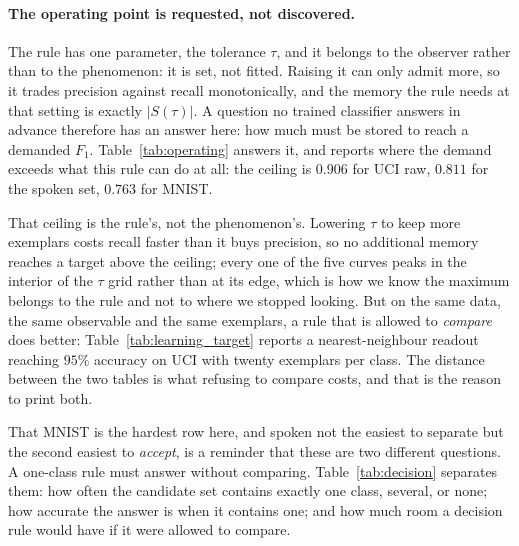 \documentclass[10pt]{article}
\theoremstyle{plain}
\theoremstyle{definition}
\theoremstyle{remark}
\newcommand{\fitwidth}[1]{%
  \resizebox{\ifdim\width>\linewidth\linewidth\else\width\fi}{!}{#1}}
\begin{document}
\begin{table}[!htbp]\centering\small
\fitwidth{}
\caption{\small Exemplars drawn without selection against exemplars chosen by
the greedy net, at equal budget $k$. Same split, same seeds, same 1-NN decision
over the ten exemplar sets; accuracy on held-out realisations, mean of ten
draws. \emph{Any $k$} is not a selection method: the column exists to show that
none is needed. The net's first point is the best single exemplar in every set;
its later points buy coverage rather than mass.}
\label{tab:selector}
\end{table}

\paragraph{The operating point is requested, not discovered.}
The rule has one parameter, the tolerance $\tau$, and it belongs to the
observer rather than to the phenomenon: it is set, not fitted. Raising it can
only admit more, so it trades precision against recall monotonically, and the
memory the rule needs at that setting is exactly $|S(\tau)|$. A question no
trained classifier answers in advance therefore has an answer here: how much
must be stored to reach a demanded $F_1$. Table~\ref{tab:operating} answers it,
and reports where the demand exceeds what this rule can do at all: the ceiling
is $0.906$ for UCI raw, $0.811$ for the spoken set, $0.763$ for MNIST.

That ceiling is the rule's, not the phenomenon's. Lowering $\tau$ to keep more exemplars costs
recall faster than it buys precision, so no additional memory reaches a target
above the ceiling; every one of the five curves peaks in the interior of the
$\tau$ grid rather than at its edge, which is how we know the maximum belongs
to the rule and not to where we stopped looking. But on the same data, the same
observable and the same exemplars, a rule that is allowed to \emph{compare}
does better: Table~\ref{tab:learning_target} reports a nearest-neighbour
readout reaching $95\%$ accuracy on UCI with twenty exemplars per class. The
distance between the two tables is what refusing to compare costs, and that is
the reason to print both.

That MNIST is the hardest row here, and spoken not the easiest to separate but
the second easiest to \emph{accept}, is a reminder that these are two different
questions. A one-class rule must answer without comparing.
Table~\ref{tab:decision} separates them: how often the candidate set contains
exactly one class, several, or none; how accurate the answer is when it
contains one; and how much room a decision rule would have if it were allowed
to compare.
\end{document}
